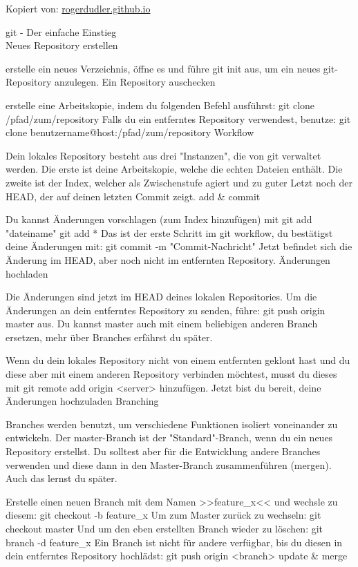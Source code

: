 \documentclass[11pt]{article}
\begin{document}
Kopiert von: \url{rogerdudler.github.io}

\Large{git - Der einfache Einstieg} \\

Neues Repository erstellen

erstelle ein neues Verzeichnis, öffne es und führe
git init
aus, um ein neues git-Repository anzulegen.
Ein Repository auschecken

erstelle eine Arbeitskopie, indem du folgenden Befehl ausführst:
git clone /pfad/zum/repository
Falls du ein entferntes Repository verwendest, benutze:
git clone benutzername@host:/pfad/zum/repository
Workflow

Dein lokales Repository besteht aus drei "Instanzen", die von git verwaltet werden. Die erste ist deine Arbeitskopie, welche die echten Dateien enthält. Die zweite ist der Index, welcher als Zwischenstufe agiert und zu guter Letzt noch der HEAD, der auf deinen letzten Commit zeigt.
add \& commit

Du kannst Änderungen vorschlagen (zum Index hinzufügen) mit
git add "dateiname"
git add *
Das ist der erste Schritt im git workflow, du bestätigst deine Änderungen mit:
git commit -m "Commit-Nachricht"
Jetzt befindet sich die Änderung im HEAD, aber noch nicht im entfernten Repository.
Änderungen hochladen

Die Änderungen sind jetzt im HEAD deines lokalen Repositories. Um die Änderungen an dein entferntes Repository zu senden, führe:
git push origin master
aus. Du kannst master auch mit einem beliebigen anderen Branch ersetzen, mehr über Branches erfährst du später.

Wenn du dein lokales Repository nicht von einem entfernten geklont hast und du diese aber mit einem anderen Repository verbinden möchtest, musst du dieses mit
git remote add origin <server>
hinzufügen. Jetzt bist du bereit, deine Änderungen hochzuladen
Branching

Branches werden benutzt, um verschiedene Funktionen isoliert voneinander zu entwickeln. Der master-Branch ist der "Standard"-Branch, wenn du ein neues Repository erstellst. Du solltest aber für die Entwicklung andere Branches verwenden und diese dann in den Master-Branch zusammenführen (mergen). Auch das lernst du später.

Erstelle einen neuen Branch mit dem Namen >>feature\_x<< und wechsle zu diesem:
git checkout -b feature\_x
Um zum Master zurück zu wechseln:
git checkout master
Und um den eben erstellten Branch wieder zu löschen:
git branch -d feature\_x
Ein Branch ist nicht für andere verfügbar, bis du diesen in dein entferntes Repository hochlädst:
git push origin <branch>
update \& merge
\end{document}
